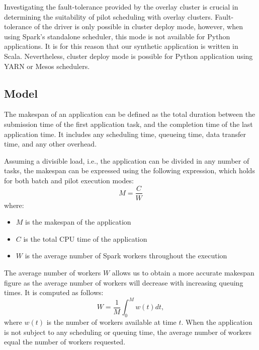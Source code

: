 \documentclass{IEEEtran}
\newcommand{\todo}[1]{\marginpar{\parbox{18mm}{\flushleft\tiny\color{red}\textbf{TODO}:
      #1}}}
\begin{document}
    Investigating the fault-tolerance provided by the overlay cluster is
    crucial in determining the suitability of pilot scheduling with overlay clusters.
    Fault-tolerance of the driver is only possible in cluster deploy mode, however,
    when using Spark's standalone scheduler, this mode is not available for Python 
    applications. It is for this reason that our synthetic application is written
    in Scala. Nevertheless, cluster deploy mode is possible for Python application
    using YARN or Mesos schedulers.

    
   
    \todo{walltime parameter of workflow}
    \subsection{Model}

    The makespan of an application can be defined as the total duration
    between the submission time of the first application task, and the
    completion time of the last application time. It includes any
    scheduling time, queueing time, data transfer time, and any other
    overhead.
    
    Assuming a divisible load, i.e., the application can be divided in any
    number of tasks, the makespan can be expressed using the following
    expression, which holds for both batch and pilot execution modes:
    \begin{equation}
        M = \frac{C}{W} \label{eq:mcw}
    \end{equation}
    where:
    \begin{itemize}
        \item $M$ is the makespan of the application
        \item $C$ is the total CPU time of the application
        \item $W$ is the average number of Spark workers throughout the execution
    \end{itemize}
    The average number of workers $W$ allows us to obtain a more accurate makespan
    figure as the average number of workers will decrease with increasing 
    queuing times. It is computed as follows:
    $$
    W = \frac{1}{M}\int_0^M{w(t)dt},
    $$
    where $w(t)$ is the number of workers available at time $t$. When the
    application is not subject to any scheduling or queuing time, the
    average number of workers equal the number of workers requested. 
\end{document}
